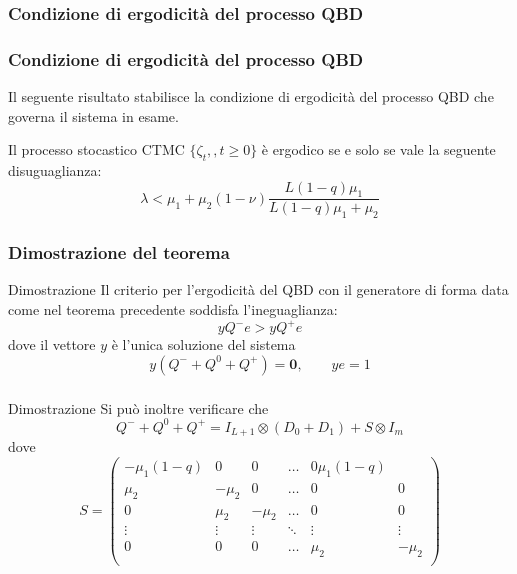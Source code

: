 \documentclass{beamer}
\begin{document}
\subsubsection{Condizione di ergodicità del processo QBD}

\begin{frame}
    \frametitle{Condizione di ergodicità del processo QBD}
    Il seguente risultato stabilisce la condizione di ergodicità del processo QBD che governa il sistema in esame.
    \begin{theorem}
        Il processo stocastico CTMC $\{\zeta_t,,t\geq 0\}$ è ergodico se e solo se vale la seguente disuguaglianza:
        \begin{equation*}\label{eq:ergodicity}
            \lambda < \mu_1 + \mu_2(1 - \nu) \frac{L(1-q)\mu_1}{L(1-q)\mu_1 + \mu_2}
        \end{equation*}
    \end{theorem}
\end{frame}

\begin{frame}
    \frametitle{Dimostrazione del teorema}
    \begin{block}{Dimostrazione}
        Il criterio per l'ergodicità del QBD con il generatore di forma data come nel teorema precedente soddisfa l'ineguaglianza:
        \begin{equation*}
            y Q^- e > y Q^+e
        \end{equation*}
        dove il vettore $y$ è l'unica soluzione del sistema
        \begin{equation*}
            y(Q^- + Q^0 + Q^+) = \textbf{0}, \qquad ye = 1
        \end{equation*}

    \end{block}
\end{frame}


\begin{frame}
    \frametitle{}
    \begin{block}{Dimostrazione}
        Si può inoltre verificare che
        \begin{equation*}\label{eq:bigotimes}
            Q^- + Q^0 + Q^+ = I_{L+1} \otimes (D_0 + D_1) + S \otimes I_{m}
        \end{equation*}
        dove
        \begin{equation*}
            S =
            \begin{pmatrix}
                -\mu_1 (1-q) & 0 & 0 & \dots & 0 \mu_1(1-q) \\
                \mu_2 & -\mu_2 & 0 & \dots & 0 & 0 \\
                0 & \mu_2 & -\mu_2 & \dots & 0 & 0 \\
                \vdots & \vdots & \vdots & \ddots & \vdots & \vdots \\
                0 & 0 & 0 & \dots & \mu_2 & -\mu_2 \\
            \end{pmatrix}
        \end{equation*}
    \end{block}
\end{frame}
\end{document}
